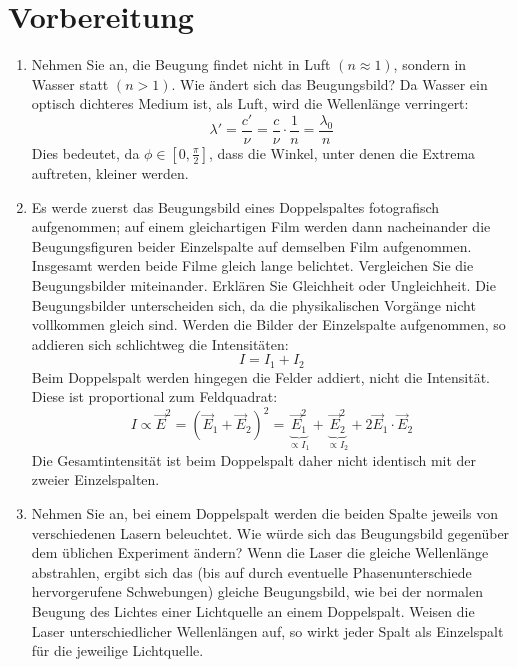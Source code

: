 \section{Vorbereitung}
\begin{enumerate}
	\item Nehmen Sie an, die Beugung findet nicht in Luft $(n\approx1)$, sondern in Wasser statt $(n>1)$. Wie ändert sich das Beugungsbild?
		\subitem Da Wasser ein optisch dichteres Medium ist, als Luft, wird die Wellenlänge verringert:
		\begin{displaymath}
			\lambda'=\frac{c'}{\nu}=\frac{c}{\nu}\cdot\frac{1}{n}=\frac{\lambda_0}{n}
		\end{displaymath}
		Dies bedeutet, da $\phi\in[0,\frac{\pi}{2}]$, dass die Winkel, unter denen die Extrema auftreten, kleiner werden.
	\item Es werde zuerst das Beugungsbild eines Doppelspaltes fotografisch aufgenommen; auf einem gleichartigen Film werden dann nacheinander die Beugungsfiguren beider Einzelspalte auf demselben Film aufgenommen. Insgesamt werden beide Filme gleich lange belichtet. Vergleichen Sie die Beugungsbilder miteinander. Erklären Sie Gleichheit oder Ungleichheit.
		\subitem Die Beugungsbilder unterscheiden sich, da die physikalischen Vorgänge nicht vollkommen gleich sind. Werden die Bilder der Einzelspalte aufgenommen, so addieren sich schlichtweg die Intensitäten:
		\begin{displaymath}
			I=I_1+I_2
		\end{displaymath}
		Beim Doppelspalt werden hingegen die Felder addiert, nicht die Intensität. Diese ist proportional zum Feldquadrat:
		\begin{displaymath}
			I\propto\vec{E}^2=(\vec{E}_1+\vec{E}_2)^2=\underbrace{\vec{E}_1^2}_{\propto I_1}+\underbrace{\vec{E}_2^2}_{\propto I_2}+2\vec{E}_1\cdot\vec{E}_2
		\end{displaymath}
		Die Gesamtintensität ist beim Doppelspalt daher nicht identisch mit der zweier Einzelspalten.
	\item Nehmen Sie an, bei einem Doppelspalt werden die beiden Spalte jeweils von verschiedenen Lasern beleuchtet. Wie würde sich das Beugungsbild gegenüber dem üblichen Experiment ändern?
		\subitem Wenn die Laser die gleiche Wellenlänge abstrahlen, ergibt sich das (bis auf durch eventuelle Phasenunterschiede hervorgerufene Schwebungen) gleiche Beugungsbild, wie bei der normalen Beugung des Lichtes einer Lichtquelle an einem Doppelspalt. Weisen die Laser unterschiedlicher Wellenlängen auf, so wirkt jeder Spalt als Einzelspalt für die jeweilige Lichtquelle.

\end{enumerate}
